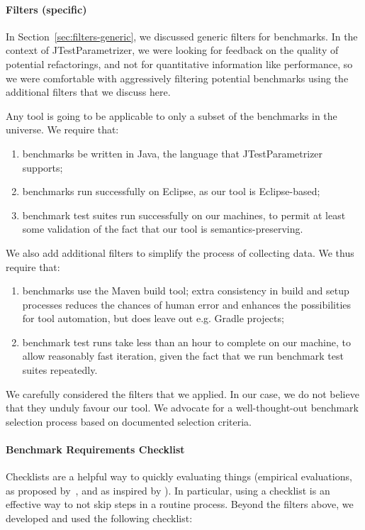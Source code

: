 \paragraph{Filters (specific)}
In Section~\ref{sec:filters-generic}, we discussed generic filters for benchmarks.
In the context of JTestParametrizer, we were looking for feedback on the quality of potential refactorings, and not for quantitative information like performance, so we were comfortable with aggressively filtering potential benchmarks using the additional filters that we discuss here.

Any tool is going to be applicable to only a subset of the benchmarks in the universe. We require that:
\begin{enumerate}
\item benchmarks be written in Java, the language that JTestParametrizer supports;
\item benchmarks run successfully on Eclipse, as our tool is Eclipse-based;
\item benchmark test suites run successfully on our machines, to permit at least some validation of the fact that our tool is semantics-preserving.
\end{enumerate}
We also add additional filters to simplify the process of collecting data. We thus require that:
\begin{enumerate}
\item benchmarks use the Maven build tool; extra consistency in build and setup processes reduces the chances of human error and enhances the possibilities for tool automation, but does leave out e.g. Gradle projects;
\item benchmark test runs take less than an hour to complete on our machine, to allow reasonably fast iteration, given the fact that we run benchmark test suites repeatedly.
\end{enumerate}
We carefully considered the filters that we applied. In our case, we do not believe that they unduly favour our tool. We advocate for a well-thought-out benchmark selection process based on documented selection criteria.

\paragraph{Benchmark Requirements Checklist}
Checklists are a helpful way to quickly evaluating things (empirical evaluations, as proposed by~, and as inspired by \cite{gawande09:_check_manif}). In particular, using a checklist is an effective way to not skip steps in a routine process. Beyond the filters above, we developed and used the following checklist:

